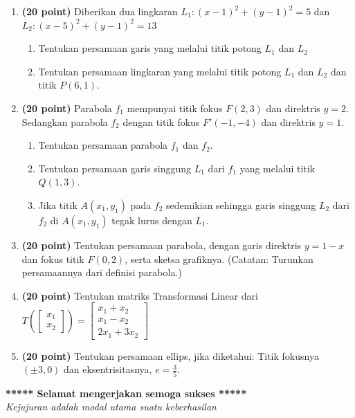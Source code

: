 \documentclass[10pt,a4paper]{article}
\begin{document}
\vspace{1em}

\begin{enumerate}
    \item \textbf{(20 point)} Diberikan dua lingkaran $L_1: {(x-1)}^2 + {(y-1)}^2 = 5$ dan $L_2: {(x-5)}^2 + {(y-1)}^2 = 13$
    \begin{enumerate}[label=\alph*.]
        \item Tentukan persamaan garis yang melalui titik potong $L_1$ dan $L_2$
        \item Tentukan persamaan lingkaran yang melalui titik potong $L_1$ dan $L_2$ dan titik $P(6,1)$.
    \end{enumerate}
    \item \textbf{(20 point)} Parabola $f_1$ mempunyai titik fokus $F(2,3)$ dan direktris $y=2$. Sedangkan parabola $f_2$ dengan titik fokus $F'(-1,-4)$ dan direktris $y = 1$.
    \begin{enumerate}[label=\alph*.]
        \item Tentukan persamaan parabola $f_1$ dan $f_2$.
        \item Tentukan persamaan garis singgung $L_1$ dari $f_1$ yang melalui titik $Q(1,3)$.
        \item Jika titik $A(x_1, y_1)$ pada $f_2$ sedemikian sehingga garis singgung $L_2$ dari $f_2$ di $A(x_1, y_1)$ tegak lurus dengan $L_1$.
    \end{enumerate}
    \item \textbf{(20 point)} Tentukan persamaan parabola, dengan garis direktris $y=1-x$ dan fokus titik $F(0,2)$, serta sketsa grafiknya. (Catatan: Turunkan persamaannya dari definisi parabola.)
    \item \textbf{(20 point)} Tentukan matriks Transformasi Linear dari $T\left(\begin{bmatrix}x_1\\x_2\end{bmatrix}\right) = \begin{bmatrix}x_1 + x_2 \\ x_1 - x_2 \\ 2x_1 + 3x_2\end{bmatrix}$
    \item \textbf{(20 point)} Tentukan persamaan ellips, jika diketahui: Titik fokusnya $(\pm 3, 0)$ dan eksentrisitasnya, $e = \frac{3}{5}$.
\end{enumerate}

\vspace{2em}
\begin{center}
    \textbf{***** Selamat mengerjakan semoga sukses *****}\\[0.5em]
    \textit{Kejujuran adalah modal utama suatu keberhasilan}
\end{center}
\end{document}
